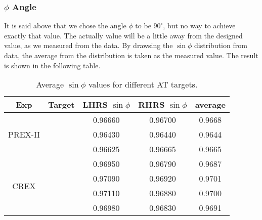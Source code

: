 \subsubsection{$\phi$ Angle}
It is said above that we chose the angle $\phi$ to be $90^\circ$, but no way to 
achieve exactly that value. The actually value will be a little away from
the designed value, as we measured from the data. By drawsing the $\sin\phi$ distribution
from data, the average from the distribution is taken as the measured value. 
The result is shown in the following table.
\begin{table}[!htbp]
    \centering
    \begin{tabular}{c c | c c c}
	\hline
	Exp & Target	& LHRS $\sin\phi$   & RHRS $\sin\phi$	& average   \\
	\hline
	\multirow{3}{*}{PREX-II}
	    & \C    & 0.96660   & 0.96700	& 0.9668    \\ 
	    & \ca   & 0.96430   & 0.96440	& 0.9644    \\ 
	    & \Pb   & 0.96625   & 0.96665	& 0.9665    \\ 
	\hline
	\multirow{4}{*}{CREX}
	    & \C    & 0.96950   & 0.96790	& 0.9687    \\ 
	    & \ca   & 0.97090   & 0.96920	& 0.9701    \\ 
	    & \Ca   & 0.97110   & 0.96880	& 0.9700    \\ 
	    & \Pb   & 0.96980   & 0.96830	& 0.9691    \\ 
	\hline
    \end{tabular}
    \caption{Average $\sin\phi$ values for different AT targets.}
\end{table}

